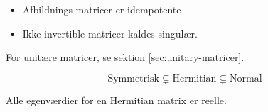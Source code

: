 \begin{itemize}
    \item Afbildnings-matricer er idempotente
    \item Ikke-invertible matricer kaldes singulær.
\end{itemize}

For unitære matricer, se sektion \ref{sec:unitary-matricer}.

\[
\text{Symmetrisk} \subsetneq \text{Hermitian} \subsetneq \text{Normal}
\]

Alle egenværdier for en Hermitian matrix er reelle.
